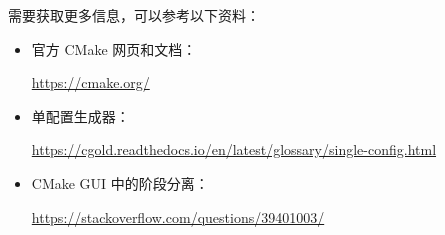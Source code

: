
需要获取更多信息，可以参考以下资料：

\begin{itemize}
\item
官方 CMake 网页和文档：

\url{https://cmake.org/}

\item
单配置生成器：

\url{https://cgold.readthedocs.io/en/latest/glossary/single-config.html}

\item
CMake GUI 中的阶段分离：

\url{https://stackoverflow.com/questions/39401003/}
\end{itemize}